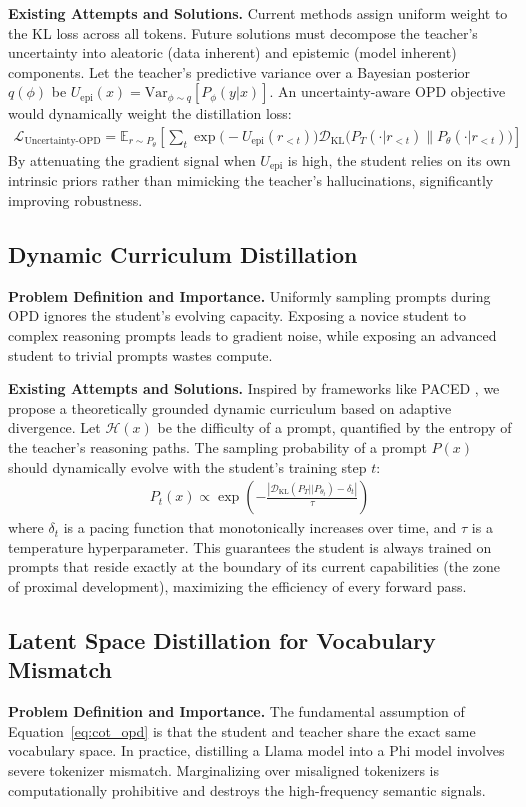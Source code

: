 \documentclass{article} %
\begin{document}
\textbf{Existing Attempts and Solutions.} Current methods assign uniform weight to the KL loss across all tokens. Future solutions must decompose the teacher's uncertainty into aleatoric (data inherent) and epistemic (model inherent) components. Let the teacher's predictive variance over a Bayesian posterior $q(\phi)$ be $U_{\text{epi}}(x) = \text{Var}_{\phi \sim q}[P_\phi(y|x)]$. An uncertainty-aware OPD objective would dynamically weight the distillation loss:
\begin{align}
\mathcal{L}_{\text{Uncertainty-OPD}} = \mathbb{E}_{r \sim P_\theta} \left[ \sum_t \exp\big(-U_{\text{epi}}(r_{<t})\big) \mathcal{D}_{\text{KL}}\Big(P_T(\cdot | r_{<t}) \parallel P_\theta(\cdot | r_{<t})\Big) \right]
\end{align}
By attenuating the gradient signal when $U_{\text{epi}}$ is high, the student relies on its own intrinsic priors rather than mimicking the teacher's hallucinations, significantly improving robustness.

\subsection{Dynamic Curriculum Distillation}
\textbf{Problem Definition and Importance.} Uniformly sampling prompts during OPD ignores the student's evolving capacity. Exposing a novice student to complex reasoning prompts leads to gradient noise, while exposing an advanced student to trivial prompts wastes compute. 

\textbf{Existing Attempts and Solutions.} Inspired by frameworks like PACED \citep{2603.11178}, we propose a theoretically grounded dynamic curriculum based on adaptive divergence. Let $\mathcal{H}(x)$ be the difficulty of a prompt, quantified by the entropy of the teacher's reasoning paths. The sampling probability of a prompt $P(x)$ should dynamically evolve with the student's training step $t$:
\begin{align}
P_t(x) \propto \exp\left( -\frac{| \mathcal{D}_{\text{KL}}(P_T || P_{\theta_t}) - \delta_t |}{\tau} \right)
\end{align}
where $\delta_t$ is a pacing function that monotonically increases over time, and $\tau$ is a temperature hyperparameter. This guarantees the student is always trained on prompts that reside exactly at the boundary of its current capabilities (the zone of proximal development), maximizing the efficiency of every forward pass.

\subsection{Latent Space Distillation for Vocabulary Mismatch}
\textbf{Problem Definition and Importance.} The fundamental assumption of Equation~\ref{eq:cot_opd} is that the student and teacher share the exact same vocabulary space. In practice, distilling a Llama model into a Phi model involves severe tokenizer mismatch. Marginalizing over misaligned tokenizers is computationally prohibitive and destroys the high-frequency semantic signals.
\end{document}

